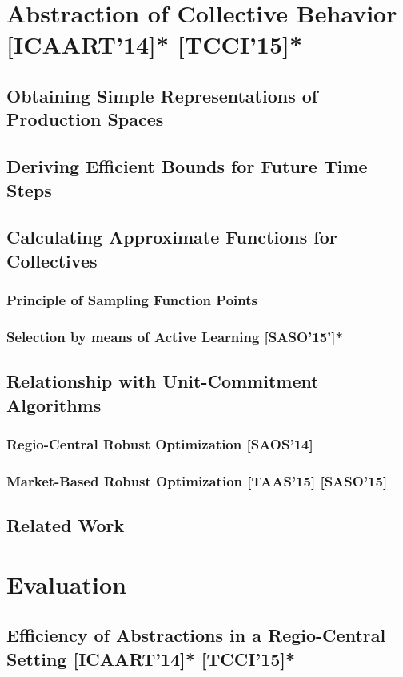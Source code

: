 \documentclass[10pt,a4paper]{book}
\begin{document}
\chapter{Abstraction of Collective Behavior [ICAART'14]* [TCCI'15]*}
\section{Obtaining Simple Representations of Production Spaces}
\section{Deriving Efficient Bounds for Future Time Steps}
\section{Calculating Approximate Functions for Collectives}
\subsection{Principle of Sampling Function Points}
\subsection{Selection by means of Active Learning [SASO'15']*}
\section{Relationship with Unit-Commitment Algorithms}
\subsection{Regio-Central Robust Optimization [SAOS'14]}
\subsection{Market-Based Robust Optimization [TAAS'15] [SASO'15]}
\section{Related Work}

\chapter{Evaluation}
\section{Efficiency of Abstractions in a Regio-Central Setting [ICAART'14]* [TCCI'15]*}
\end{document}
